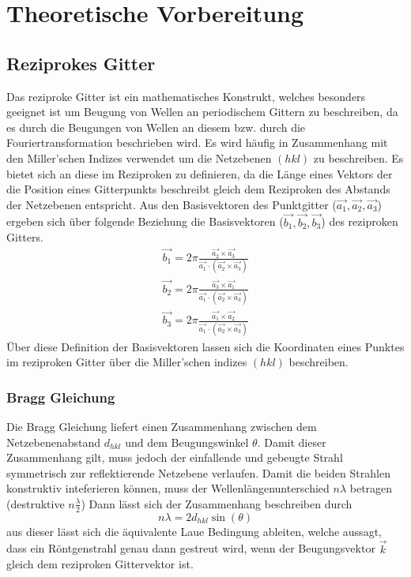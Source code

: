 \section{Theoretische Vorbereitung}
    \subsection{Reziprokes Gitter}
        Das reziproke Gitter ist ein mathematisches Konstrukt, welches besonders geeignet ist um Beugung von Wellen
        an periodischem Gittern zu beschreiben, da es durch die Beugungen von Wellen an diesem bzw. durch die 
        Fouriertransformation beschrieben wird.
         Es wird häufig in Zusammenhang mit den Miller'schen Indizes verwendet
        um die Netzebenen $(hkl)$ zu beschreiben. Es bietet sich an diese im Reziproken zu definieren, da die Länge
        eines Vektors der die Position eines Gitterpunkts beschreibt gleich dem Reziproken des Abstands der
        Netzebenen entspricht.
        Aus den Basisvektoren des Punktgitter ($\vec{a_1},\vec{a_2},\vec{a_3}$) ergeben sich über folgende Beziehung
        die Basisvektoren ($\vec{b_1},\vec{b_2},\vec{b_3}$) des reziproken Gitters.
        \begin{align*}
            \vec{b_1} = 2\pi \frac{\vec{a_2}\times \vec{a_3}}{\vec{a_1}\cdot (\vec{a_2}\times \vec{a_3})}
            \\\vec{b_2} = 2\pi \frac{\vec{a_3}\times \vec{a_1}}{\vec{a_1}\cdot (\vec{a_2}\times \vec{a_3})}
            \\\vec{b_3} = 2\pi \frac{\vec{a_1}\times \vec{a_2}}{\vec{a_1}\cdot (\vec{a_2}\times \vec{a_3})}
        \end{align*}
        Über diese Definition der Basisvektoren lassen sich die Koordinaten eines Punktes im reziproken Gitter
        über die Miller'schen indizes $(hkl)$ beschreiben.
        
        \subsubsection*{Bragg Gleichung}
            Die Bragg Gleichung liefert einen Zusammenhang zwischen dem Netzebenenabstand $d_{hkl}$ und dem
            Beugungswinkel $\theta$. Damit dieser Zusammenhang gilt, muss jedoch der einfallende und gebeugte
            Strahl symmetrisch zur reflektierende Netzebene verlaufen. Damit die beiden Strahlen konstruktiv
            inteferieren können, muss der Wellenlängenunterschied $n\lambda$ betragen (destruktive $n\frac{\lambda}{2}$)
            Dann lässt sich der Zusammenhang beschreiben durch
            \begin{equation}
                n\lambda = 2d_{hkl} \sin(\theta)
            \end{equation}
            aus dieser lässt sich die äquivalente Laue Bedingung ableiten, welche aussagt,
            dass ein Röntgenstrahl genau dann gestreut wird, wenn der Beugungsvektor $\vec{k}$ gleich dem
            reziproken Gittervektor ist. 
    
